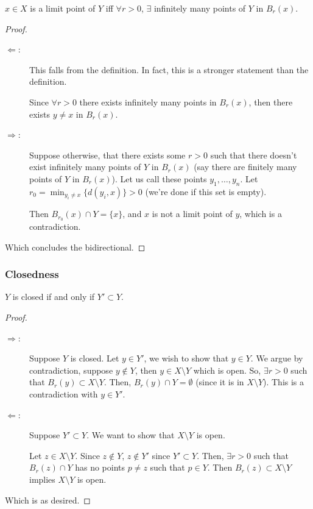 \begin{proposition}
    $x\in X$ is a limit point of $Y$ iff $\forall r>0$, $\exists$ infinitely many points of $Y$ in $B_r(x)$.
\end{proposition}
\begin{proof}
    ~\begin{description}
        \item[$\Longleftarrow$:] This falls from the definition. In fact, this is a stronger statement than the definition.

            Since $\forall r > 0$ there exists infinitely many points in $B_r(x)$, then there exists $y\neq x$ in $B_r(x)$.
        \item[$\Longrightarrow$:] Suppose otherwise, that there exists some $r > 0$ such that there doesn't exist infinitely many points of $Y$ in $B_r(x)$ (say there are finitely many points of $Y$ in $B_r(x)$). Let us call these points $y_1, \dots, y_n$. Let $r_0 = \min_{y_i\neq x}\{d(y_i, x)\} > 0$ (we're done if this set is empty).

            Then $B_{r_0}(x)\cap Y = \{x\}$, and $x$ is not a limit point of $y$, which is a contradiction.
    \end{description}
    Which concludes the bidirectional.
\end{proof}

\subsubsection{Closedness}

\begin{theorem}\label{thm:limit-points-in-closed}
    $Y$ is closed if and only if $Y' \subset Y$.
\end{theorem}
\begin{proof}
    ~\begin{description}
        \item[$\Longrightarrow$:] Suppose $Y$ is closed. Let $y \in Y'$, we wish to show that $y\in Y$. We argue by contradiction, suppose $y\not\in Y$, then $y\in X\setminus Y$ which is open. So, $\exists r > 0$ such that $B_r(y)\subset X\setminus Y$. Then, $B_r(y)\cap Y = \emptyset$ (since it is in $X\setminus Y$). This is a contradiction with $y\in Y'$.
        \item[$\Longleftarrow$:] Suppose $Y'\subset Y$. We want to show that $X \setminus Y$ is open.

            Let $z\in X\setminus Y$. Since $z\not\in Y$, $z\not\in Y'$ since $Y'\subset Y$. Then, $\exists r > 0$ such that $B_r(z)\cap Y$ has no points $p\neq z$ such that $p\in Y$. Then $B_r(z)\subset X\setminus Y$ implies $X\setminus Y$ is open.
    \end{description}
    Which is as desired.
\end{proof}

